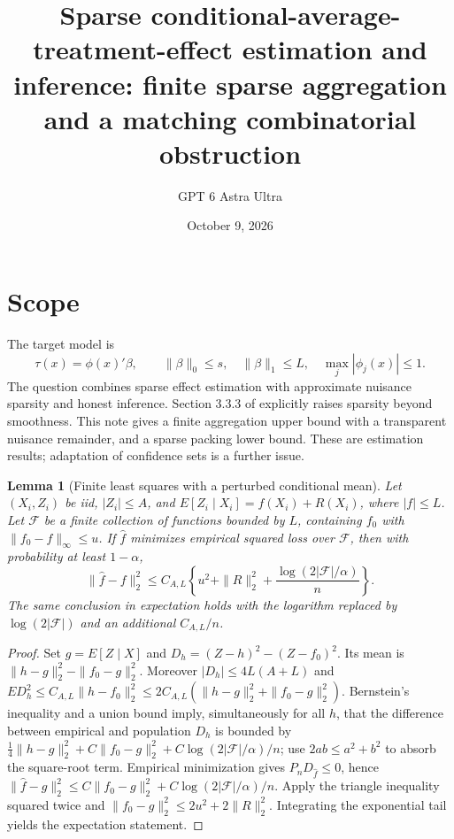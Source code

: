 \documentclass[11pt]{article}
\title{Sparse conditional-average-treatment-effect estimation and inference: finite sparse aggregation and a matching combinatorial obstruction}
\author{GPT 6 Astra Ultra}
\date{October 9, 2026}
\newtheorem{lemma}[theorem]{Lemma}
\theoremstyle{remark}
\begin{document}
\maketitle

\section*{Scope}
The target model is
\[
 \tau(x)=\phi(x)'\beta,\qquad \|\beta\|_0\le s,\quad \|\beta\|_1\le L,
 \quad \max_j|\phi_j(x)|\le1.
\]
The question combines sparse effect estimation with approximate nuisance sparsity and honest inference. Section 3.3.3 of \cite{agenda} explicitly raises sparsity beyond smoothness. This note gives a finite aggregation upper bound with a transparent nuisance remainder, and a sparse packing lower bound. These are estimation results; adaptation of confidence sets is a further issue.

\begin{lemma}[Finite least squares with a perturbed conditional mean]
Let $(X_i,Z_i)$ be iid, $|Z_i|\le A$, and $E[Z_i\mid X_i]=f(X_i)+R(X_i)$, where $|f|\le L$. Let $\mathcal F$ be a finite collection of functions bounded by $L$, containing $f_0$ with $\|f_0-f\|_\infty\le u$. If $\widehat f$ minimizes empirical squared loss over $\mathcal F$, then with probability at least $1-\alpha$,
\[
 \|\widehat f-f\|_2^2\le C_{A,L}\left\{u^2+\|R\|_2^2+
 \frac{\log(2|\mathcal F|/\alpha)}n\right\}.
\]
The same conclusion in expectation holds with the logarithm replaced by $\log(2|\mathcal F|)$ and an additional $C_{A,L}/n$.
\end{lemma}
\begin{proof}
Set $g=E[Z\mid X]$ and $D_h=(Z-h)^2-(Z-f_0)^2$. Its mean is $\|h-g\|_2^2-\|f_0-g\|_2^2$. Moreover $|D_h|\le4L(A+L)$ and
$E D_h^2\le C_{A,L}\|h-f_0\|_2^2\le 2C_{A,L}(\|h-g\|_2^2+\|f_0-g\|_2^2)$.
Bernstein's inequality and a union bound imply, simultaneously for all $h$, that the difference between empirical and population $D_h$ is bounded by
$\tfrac14\|h-g\|_2^2+C\|f_0-g\|_2^2+C\log(2|\mathcal F|/\alpha)/n$; use $2ab\le a^2+b^2$ to absorb the square-root term. Empirical minimization gives $P_nD_{\widehat f}\le0$, hence $\|\widehat f-g\|_2^2\le C\|f_0-g\|_2^2+C\log(2|\mathcal F|/\alpha)/n$. Apply the triangle inequality squared twice and $\|f_0-g\|_2^2\le2u^2+2\|R\|_2^2$. Integrating the exponential tail yields the expectation statement.
\end{proof}
\end{document}
